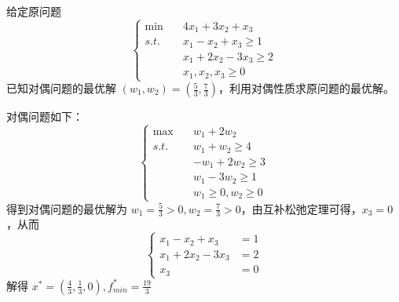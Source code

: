 \begin{problem}
    给定原问题
    \[\begin{cases}
        \min \quad &4x_1 + 3x_2 + x_3 \\
        s.t. \quad &x_1 - x_2 + x_3 \ge 1\\
        &x_1 + 2x_2 - 3x_3 \ge 2\\
        &x_1, x_2, x_3 \ge 0
    \end{cases}\]
    已知对偶问题的最优解 $(w_1, w_2) = (\frac{5}{3}, \frac{7}{3})$，利用对偶性质求原问题的最优解。
\end{problem}
\begin{solution}
    对偶问题如下：
    \[\begin{cases}
        \max \quad &w_1 + 2w_2\\
        s.t. \quad &w_1 + w_2 \ge 4\\
        &-w_1 + 2w_2 \ge 3\\
        &w_1 - 3w_2 \ge 1\\
        &w_1 \ge 0, w_2 \ge 0
    \end{cases}\]
    得到对偶问题的最优解为 $w_1 = \frac{5}{3} > 0, w_2 = \frac{7}{3} > 0$，由互补松弛定理可得，$x_3 = 0$，从而
    \[\begin{cases}
        x_1 - x_2 + x_3 &= 1\\
        x_1 + 2x_2 - 3x_3 &= 2\\
        x_3 &= 0
    \end{cases}\]
    解得 $x^* = (\frac{4}{3}, \frac{1}{3}, 0), f_{min}^* = \frac{19}{3}$
\end{solution}


